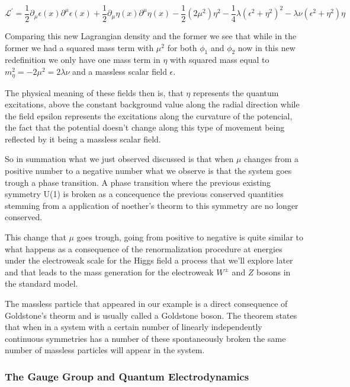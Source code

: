 \documentclass[11pt,twoside,a4paper]{article}
\begin{document}
\begin{equation}
 \mathcal{L}^\prime = \frac{1}{2} \partial_\mu \epsilon(x) \partial^\mu \epsilon(x) + \frac{1}{2}\partial_\mu \eta(x) \partial^\mu \eta(x)  - \frac{1}{2} ( 2\mu ^2)  \eta^2 - \frac{1}{4} \lambda (\epsilon^2 + \eta^2)^2 - \lambda  \nu  (\epsilon^2 + \eta^2) \eta
\end{equation}

Comparing this new Lagrangian density and the former we see that while in the former we had a squared mass term with $\mu^2$ for both $\phi_1$ and $\phi_2$ now in this new redefinition we only have one mass term in $\eta$ with squared mass equal to $ m^2_\eta = - 2 \mu^2 = 2 \lambda \nu $ and a massless scalar field $\epsilon$.

The physical meaning of these fields then is, that $\eta$ represents the quantum excitations, above the constant background value along the radial direction while the field epsilon represents the excitations along the curvature of the potencial, the fact that the potential doesn't change along this type of movement being reflected by it being a massless scalar field. 

So in summation what we just observed discussed is that when $\mu$ changes from a positive number to a negative number what we observe is that the system goes trough a phase transition. A phase transition where the previous existing symmetry U(1) is broken as a concequence the previous conserved quantities stemming from a application of noether's theorm to this symmetry are no longer conserved. 

This change that $\mu$ goes trough, going from positive to negative is quite similar to what happens as a  consequence of the renormalization procedure at energies under the electroweak scale for the Higgs field a process that we'll explore later and that leads to the mass generation for the electroweak $W^\pm$ and $Z$ bosons in the standard model.

The massless particle that appeared in our example is a direct consequence of Goldstone's theorm and is usually called a Goldstone boson. The theorem states that when in a system with a certain number of linearly independently continuous symmetries has a number of these spontaneously  broken the same number of  massless particles will appear in the system. 

\subsubsection{The Gauge Group and Quantum Electrodynamics}
\end{document}
